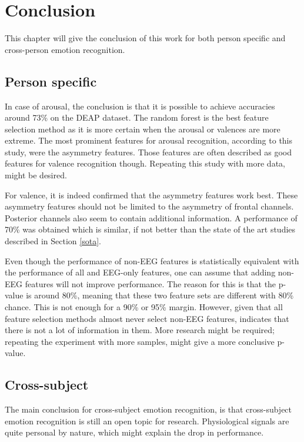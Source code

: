 \chapter{Conclusion}
{\samenvatting This chapter will give the conclusion of this work for both person specific and cross-person emotion recognition.}

\section{Person specific}
In case of arousal, the conclusion is that it is possible to achieve accuracies around 73\% on the DEAP dataset. The random forest is the best feature selection method as it is more certain when the arousal or valences are more extreme. The most prominent features for arousal recognition, according to this study, were the asymmetry features. Those features are often described as good features for valence recognition though. Repeating this study with more data, might be desired.

\npar

For valence, it is indeed confirmed that the asymmetry features work best. These asymmetry features should not be limited to the asymmetry of frontal channels. Posterior channels also seem to contain additional information. A performance of 70\% was obtained which is similar, if not better than the state of the art studies described in Section \ref{sota}. 

\npar

Even though the performance of non-EEG features is statistically equivalent with the performance of all and EEG-only features, one can assume that adding non-EEG features will not improve performance. The reason for this is that the p-value is around 80\%, meaning that these two feature sets are different with 80\% chance. This is not enough for a 90\% or 95\% margin. However, given that all feature selection methods almost never select non-EEG features, indicates that there is not a lot of information in them. More research might be required; repeating the experiment with more samples, might give a more conclusive p-value.

\clearpage

\section{Cross-subject}

The main conclusion for cross-subject emotion recognition, is that cross-subject emotion recognition is still an open topic for research. Physiological signals are quite personal by nature, which might explain the drop in performance.

